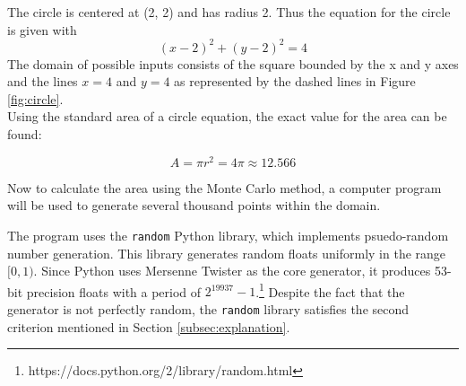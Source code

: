 \documentclass[10pt, letterpaper]{article}
\begin{document}
  The circle is centered at (2, 2) and has radius 2. Thus the equation for the circle is given with
  \[ (x-2)^2 + (y-2)^2 = 4 \]
  The domain of possible inputs consists of the square bounded by the x and y axes and the lines
  $x = 4$ and $y = 4$ as represented by the dashed lines in Figure \ref{fig:circle}. \\

  Using the standard area of a circle equation, the exact value for the area can be found:

  \[ A = \pi r^2 = 4\pi \approx 12.566 \]

  Now to calculate the area using the Monte Carlo method, a computer program will be used to generate several thousand
  points within the domain.

  The program uses the \texttt{random} Python library, which implements psuedo-random number generation.
  This library generates random floats uniformly in the range $[0, 1)$. Since Python uses Mersenne Twister as the core generator,
  it produces 53-bit precision floats with a period of $2^{19937} - 1$.\footnote{https://docs.python.org/2/library/random.html}
  Despite the fact that the generator is not perfectly random, the \texttt{random} library satisfies the second criterion mentioned
  in Section \ref{subsec:explanation}.
\end{document}
